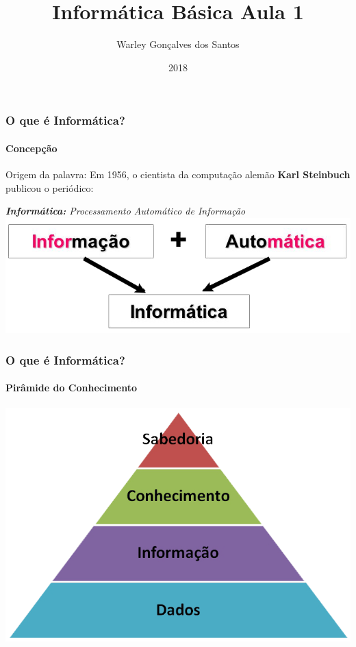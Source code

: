\documentclass[12pt,a4paper,final]{beamer}
\author{Warley Gonçalves dos Santos}
\title{Informática Básica Aula 1}
\institute{Associação Gesto de Amor}
\date{2018}
\begin{document}
	\begin{frame}
		\titlepage
	\end{frame}

    \begin{frame}
        \frametitle{O que é Informática?}
        \framesubtitle{Concepção}
        \begin{block}{Origem da palavra:}
            Em 1956, o cientista da computação alemão \textbf{Karl Steinbuch} publicou o periódico:
        \end{block}
        \begin{block}{}
             \centering
             \emph{\textbf{Informática:} Processamento Automático de Informação}
             \includegraphics[scale=0.3]{Imagens/informatica.png}
        \end{block}
	\end{frame}
    \begin{frame}
        \frametitle{O que é Informática?}
        \framesubtitle{Pirâmide do Conhecimento}
        \begin{block}{}
             \centering
             \includegraphics[scale=0.5]{Imagens/piramede.png}
        \end{block}
	\end{frame}
\end{document}
